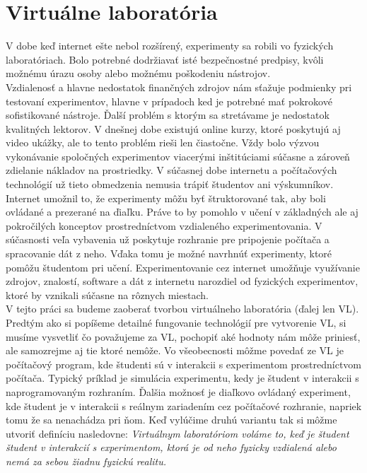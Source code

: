 \section{Virtuálne laboratória}
\indent V dobe keď internet ešte nebol rozšírený, experimenty sa robili vo fyzických laboratóriach. Bolo potrebné dodržiavať isté bezpečnostné predpisy, kvôli možnému úrazu osoby alebo možnému poškodeniu nástrojov.\\
\indent Vzdialenosť a hlavne nedostatok finančných zdrojov nám sťažuje podmienky pri testovaní experimentov, hlavne v prípadoch ked je potrebné mať pokrokové sofistikované nástroje. Ďalší problém s ktorým sa stretávame je nedostatok kvalitných lektorov. V dnešnej dobe existujú online kurzy, ktoré poskytujú aj video ukážky, ale to tento problém rieši len čiastočne. Vždy bolo výzvou vykonávanie spoločných experimentov viacerými inštitúciami súčasne a zároveň zdielanie nákladov na prostriedky. V súčasnej dobe internetu a počítačových technológií už tieto obmedzenia nemusia trápiť študentov ani výskumníkov. Internet umožnil to, že experimenty môžu byť štruktorované tak, aby boli ovládané a prezerané na ďiaľku. Práve to by pomohlo v učení v základných ale aj pokročilých konceptov prostredníctvom vzdialeného experimentovania. V súčasnosti veľa vybavenia už poskytuje rozhranie pre pripojenie počítača a spracovanie dát z neho. Vďaka tomu je možné navrhnúť experimenty, ktoré pomôžu študentom pri učení. Experimentovanie cez internet umožňuje využívanie zdrojov, znalostí, software a dát z  internetu narozdiel od fyzických experimentov, ktoré by vznikali súčasne na rôznych miestach.\cite{vlabphylosopfy}\\
\indent V tejto práci sa budeme zaoberať tvorbou virtuálneho laboratória (ďalej len VL). Predtým ako si popíšeme detailné fungovanie technológií pre vytvorenie VL, si musíme vysvetliť čo považujeme za VL, pochopiť aké hodnoty nám môže priniesť, ale samozrejme aj tie ktoré nemôže. Vo všeobecnosti môžme povedať ze VL je počítačový program, kde študenti sú v interakcii s experimentom prostredníctvom počítača. Typický príklad je simulácia experimentu, kedy je študent v interakcii s naprogramovaným rozhraním. Ďalšia možnosť je diaľkovo ovládaný experiment, kde študent je v interakcii s reálnym zariadením cez počítačové rozhranie, napriek tomu že sa nenachádza pri ňom. Keď vylúčime druhú variantu tak si môžme utvoriť definíciu nasledovne: \textit{Virtuálnym laboratóriom voláme to, keď je študent študent v interakcií s experimentom, ktorá je od neho fyzicky vzdialená alebo nemá za sebou žiadnu fyzickú realitu.}\cite{hatherly}

